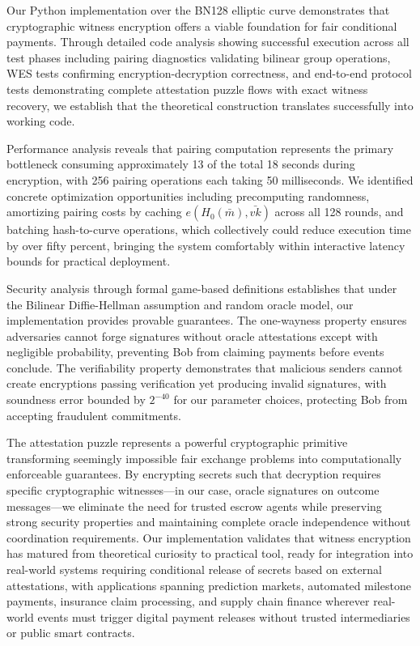 \documentclass[11pt,a4paper]{article}
\begin{document}
{Our Python implementation over the BN128 elliptic curve demonstrates that cryptographic witness encryption offers a viable foundation for fair conditional payments. Through detailed code analysis showing successful execution across all test phases including pairing diagnostics validating bilinear group operations, WES tests confirming encryption-decryption correctness, and end-to-end protocol tests demonstrating complete attestation puzzle flows with exact witness recovery, we establish that the theoretical construction translates successfully into working code.

Performance analysis reveals that pairing computation represents the primary bottleneck consuming approximately 13 of the total 18 seconds during encryption, with 256 pairing operations each taking 50 milliseconds. We identified concrete optimization opportunities including precomputing randomness, amortizing pairing costs by caching $e(H_0(\bar{m}), \bar{vk})$ across all 128 rounds, and batching hash-to-curve operations, which collectively could reduce execution time by over fifty percent, bringing the system comfortably within interactive latency bounds for practical deployment.

Security analysis through formal game-based definitions establishes that under the Bilinear Diffie-Hellman assumption and random oracle model, our implementation provides provable guarantees. The one-wayness property ensures adversaries cannot forge signatures without oracle attestations except with negligible probability, preventing Bob from claiming payments before events conclude. The verifiability property demonstrates that malicious senders cannot create encryptions passing verification yet producing invalid signatures, with soundness error bounded by $2^{-40}$ for our parameter choices, protecting Bob from accepting fraudulent commitments.

The attestation puzzle represents a powerful cryptographic primitive transforming seemingly impossible fair exchange problems into computationally enforceable guarantees. By encrypting secrets such that decryption requires specific cryptographic witnesses—in our case, oracle signatures on outcome messages—we eliminate the need for trusted escrow agents while preserving strong security properties and maintaining complete oracle independence without coordination requirements. Our implementation validates that witness encryption has matured from theoretical curiosity to practical tool, ready for integration into real-world systems requiring conditional release of secrets based on external attestations, with applications spanning prediction markets, automated milestone payments, insurance claim processing, and supply chain finance wherever real-world events must trigger digital payment releases without trusted intermediaries or public smart contracts.

}
\end{document}
